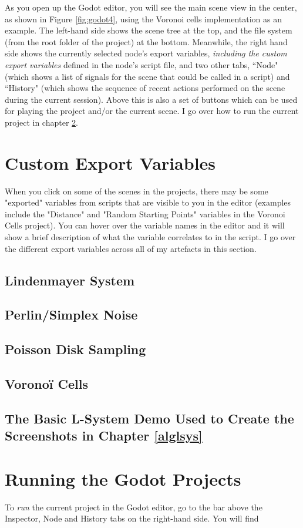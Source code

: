 As you open up the Godot editor, you will see the main scene view in the center, as shown in Figure \ref{fig:godot4}, using the Voronoi cells implementation as an example. The left-hand side shows the scene tree at the top, and the file system (from the root folder of the project) at the bottom. Meanwhile, the right hand side shows the currently selected node's export variables, \textit{including the custom export variables} defined in the node's script file, and two other tabs, ``Node" (which shows a list of signals for the scene that could be called in a script) and ``History" (which shows the sequence of recent actions performed on the scene during the current session). Above this is also a set of buttons which can be used for playing the project and/or the current scene. I go over how to run the current project in chapter \ref{runproject}.

\section{Custom Export Variables} 

When you click on some of the scenes in the projects, there may be some "exported" variables from scripts that are visible to you in the editor (examples include the "Distance" and "Random Starting Points" variables in the Voronoi Cells project). You can hover over the variable names in the editor and it will show a brief description of what the variable correlates to in the script. I go over the different export variables across all of my artefacts in this section.

\subsection{Lindenmayer System}

\subsection{Perlin/Simplex Noise}

\subsection{Poisson Disk Sampling}

\subsection{Voronoï Cells}

\subsection{The Basic L-System Demo Used to Create the Screenshots in Chapter \ref{alglsys}}

\section{Running the Godot Projects} \label{runproject}

To \textit{run} the current project in the Godot editor, go to the bar above the Inspector, Node and History tabs on the right-hand side. You will find   
